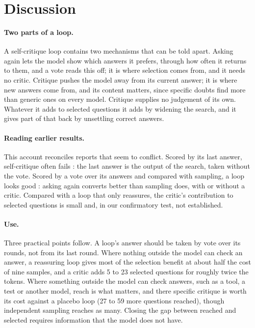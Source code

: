 \documentclass[11pt]{article}
\begin{document}
\section{Discussion}

\paragraph{Two parts of a loop.}
A self-critique loop contains two mechanisms that can be told apart.
Asking again lets the model show which answers it prefers, through how often it returns to them, and a vote reads this off; it is where selection comes from, and it needs no critic.
Critique pushes the model away from its current answer; it is where new answers come from, and its content matters, since specific doubts find more than generic ones on every model.
Critique supplies no judgement of its own.
Whatever it adds to selected questions it adds by widening the search, and it gives part of that back by unsettling correct answers.

\paragraph{Reading earlier results.}
This account reconciles reports that seem to conflict.
Scored by its last answer, self-critique often fails \citep{huang2024cannot,stechly2024selfverification}: the last answer is the output of the search, taken without the vote.
Scored by a vote over its answers and compared with sampling, a loop looks good \citep{bilal2026refining}: asking again converts better than sampling does, with or without a critic.
Compared with a loop that only reassures, the critic's contribution to selected questions is small and, in our confirmatory test, not established.

\paragraph{Use.}
Three practical points follow.
A loop's answer should be taken by vote over its rounds, not from its last round.
Where nothing outside the model can check an answer, a reassuring loop gives most of the selection benefit at about half the cost of nine samples, and a critic adds 5 to 23 selected questions for roughly twice the tokens.
Where something outside the model can check answers, such as a tool, a test or another model, reach is what matters, and there specific critique is worth its cost against a placebo loop (27 to 59 more questions reached), though independent sampling reaches as many.
Closing the gap between reached and selected requires information that the model does not have.
\end{document}
